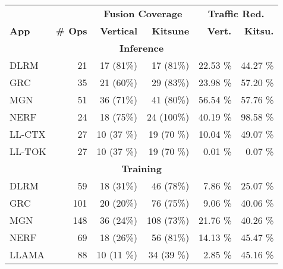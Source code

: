 \begin{tabular}{lrrrrr}
\textbf{}    & \textbf{}       & \multicolumn{2}{c}{\textbf{Fusion Coverage}} & \multicolumn{2}{c}{\textbf{Traffic Red.}} \\
\textbf{App} & \textbf{\# Ops} & \textbf{Vertical}      & \textbf{Kitsune}     & \textbf{Vert.}         & \textbf{Kitsu.}        \\ \hline
\multicolumn{6}{c}{\textbf{Inference}}                                                                                              \\ \hline
DLRM         & 21              & 17 (81\%)             & 17 (81\%)            & 22.53 \%                 & 44.27 \%             \\
GRC          & 35              & 21 (60\%)             & 29 (83\%)            & 23.98 \%                 & 57.20 \%             \\
MGN          & 51              & 36 (71\%)             & 41 (80\%)            & 56.54 \%                 & 57.76 \%             \\
NERF         & 24              & 18 (75\%)             & 24 (100\%)           & 40.19 \%                 & 98.58 \%             \\ 
LL-CTX       & 27              & 10 (37 \%)            & 19 (70 \%)           & 10.04 \%                 & 49.07 \%             \\ 
LL-TOK       & 27              & 10 (37 \%)            & 19 (70 \%)           & 0.01 \%                  & 0.07 \%                \\ 
\hline
\multicolumn{6}{c}{\textbf{Training}}                                                                                               \\ \hline
DLRM         & 59              & 18 (31\%)             & 46 (78\%)            & 7.86 \%                     & 25.07 \%                \\
GRC          & 101             & 20 (20\%)             & 76 (75\%)            & 9.06 \%                     & 40.06 \%                \\
MGN          & 148             & 36 (24\%)             & 108 (73\%)           & 21.76 \%                    & 40.26 \%                \\
NERF         & 69              & 18 (26\%)             & 56 (81\%)            & 14.13 \%                    & 45.47 \%                \\ 
LLAMA        & 88              & 10 (11 \%)            & 34 (39 \%)           & 2.85 \%                     & 45.16 \%                \\ 
\hline
\end{tabular}